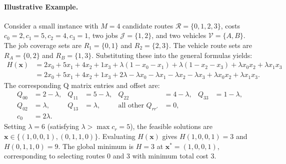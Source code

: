 \documentclass[12pt]{article}
\begin{document}
\paragraph{Illustrative Example.}
Consider a small instance with $M=4$ candidate routes $\mathcal{R} = \{0, 1, 2, 3\}$, costs $c_0=2, c_1=5, c_2=4, c_3=1$, two jobs $\mathcal{J}=\{1,2\}$, and two vehicles $\mathcal{V}=\{A,B\}$. The job coverage sets are $R_1 = \{0,1\}$ and $R_2 = \{2,3\}$. The vehicle route sets are $R_A = \{0,2\}$ and $R_B = \{1,3\}$.
Substituting these into the general formulas yields:
\begin{align}
    H(\mathbf{x}) &= 2x_0 + 5x_1 + 4x_2 + 1x_3 + \lambda(1 - x_0 - x_1) + \lambda(1 - x_2 - x_3) + \lambda x_0 x_2 + \lambda x_1 x_3 \\
    &= 2x_0 + 5x_1 + 4x_2 + 1x_3 + 2\lambda - \lambda x_0 - \lambda x_1 - \lambda x_2 - \lambda x_3 + \lambda x_0 x_2 + \lambda x_1 x_3.
\end{align}
The corresponding Q matrix entries and offset are:
\begin{align}
    Q_{00} &= 2 - \lambda, & Q_{11} &= 5 - \lambda, & Q_{22} &= 4 - \lambda, & Q_{33} &= 1 - \lambda, \\
    Q_{02} &= \lambda, & Q_{13} &= \lambda, & \text{all other } Q_{rr'} &= 0, \\
    c_0 &= 2\lambda.
\end{align}
Setting $\lambda = 6$ (satisfying $\lambda > \max c_r = 5$), the feasible solutions are $\mathbf{x} \in \{(1,0,0,1), (0,1,1,0)\}$. Evaluating $H(\mathbf{x})$ gives $H(1,0,0,1) = 3$ and $H(0,1,1,0) = 9$. The global minimum is $H=3$ at $\mathbf{x}^* = (1,0,0,1)$, corresponding to selecting routes $0$ and $3$ with minimum total cost $3$.
\end{document}
